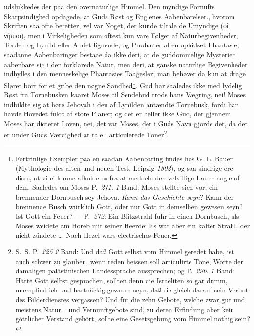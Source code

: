 \documentclass[12pt]{book}
\begin{document}
\setcounter{footnote}{0}%
udslukkedes der paa den overnaturlige Himmel. Den myndige Fornufts
Skarpsindighed opdagede, at Guds Røst og Englenes Aabenbarelser., hvorom
Skriften saa ofte beretter, vel var Noget, der kunde tiltale de Umyndige (οἱ
νήπιοι), men i Virkeligheden som oftest kun vare Følger af Naturbegivenheder,
Torden og Lynild eller Andet lignende, og Producter af en ophidset Phantasie;
saadanne Aabenbaringer bestaae da ikke deri, at de guddommelige Mysterier
aabenbare sig i den forklarede Natur, men deri, at ganske naturlige
Begivenheder indhylles i den menneskelige Phantasies Taageslør; man behøver da
kun at drage Sløret bort for et gribe den nøgne Sandhed\footnote{Fortrinlige
Exempler paa en saadan Aabenbaring findes hos G. L. Bauer (Mythologie des alten
und neuen Test. Leipzig \textit{1802}), og saa sindrige ere disse, at vi ei
kunne afholde os fra at meddele den velvillige Læser nogle af dem. Saaledes om
Moses P.~\textit{271}. \textit{1} Band: Moses stellte sich vor, ein brennender
Dornbusch sey Jehova. \emph{Kann das Geschichte seyn}? Kann der brennende Busch
würklich Gott, oder nur Gott in demselben gewesen seyn? Ist Gott ein Feuer? ---
P.~\textit{272}: Ein Blitzstrahl fuhr in einen Dornbusch, als Moses weidete am
Horeb mit seiner Heerde: Es war aber ein kalter Strahl, der nicht zündete
\ldots\ Nach Hezel wars electrisches Feuer.}. Gud har saaledes ikke med lydelig
Røst fra Tornebusken kaaret Moses til Sendebud trods hans Vægring, nei! Moses
indbildte sig at høre Jehovah i den af Lynilden antændte Tornebusk, fordi han
havde Hovedet fuldt af store Planer; og det er heller ikke Gud, der gjennem
Moses har dicteret Loven, nei, det var Moses, der i Guds Navn gjorde det, da
det er under Guds Værdighed at tale i articulerede Toner\footnote{S.~S.
P.~\textit{225} \textit{2} Band: Und daß Gott selbst vom Himmel geredet habe,
ist auch schwer zu glauben, wenn reden heissen soll articulirte Töne, Worte der
damaligen palästinischen Landessprache aussprechen; og P.~\textit{296}.
\textit{1} Band: Hätte Gott selbst gesprochen, sollten denn die Israeliten so
gar dumm, unempfindlich und hartnäckig gewesen seyn, daß sie gleich darauf sein
Verbot des Bilderdienstes vergassen? Und für die zehn Gebote, welche zwar gut
und meistens Natur= und Vernunftgebote sind, zu deren Erfindung aber kein
göttlicher Verstand gehört, sollte eine Gesetzgebung vom Himmel nöthig sein?}.
\end{document}
